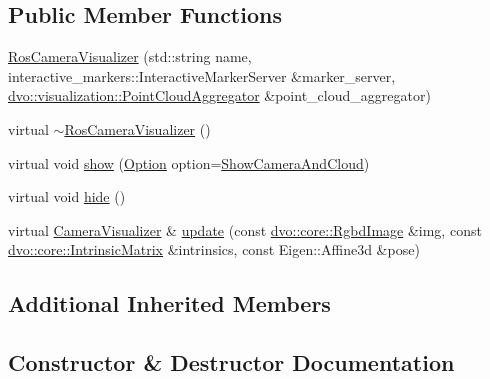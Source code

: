 \subsection*{Public Member Functions}
\begin{DoxyCompactItemize}
\item 
\mbox{\hyperlink{classdvo__ros_1_1visualization_1_1internal_1_1_ros_camera_visualizer_a48e16edb7cb922fd824f4733b775d0b6}{Ros\+Camera\+Visualizer}} (std\+::string name, interactive\+\_\+markers\+::\+Interactive\+Marker\+Server \&marker\+\_\+server, \mbox{\hyperlink{classdvo_1_1visualization_1_1_point_cloud_aggregator}{dvo\+::visualization\+::\+Point\+Cloud\+Aggregator}} \&point\+\_\+cloud\+\_\+aggregator)
\item 
virtual \mbox{\hyperlink{classdvo__ros_1_1visualization_1_1internal_1_1_ros_camera_visualizer_aec973f21c7f3bc77ab4253b86f370dbf}{$\sim$\+Ros\+Camera\+Visualizer}} ()
\item 
virtual void \mbox{\hyperlink{classdvo__ros_1_1visualization_1_1internal_1_1_ros_camera_visualizer_afb9b360caa2de42ad4b9fd55c85b98df}{show}} (\mbox{\hyperlink{classdvo_1_1visualization_1_1_camera_visualizer_a0526f50be9f298c4f7d1f91018d50af7}{Option}} option=\mbox{\hyperlink{classdvo_1_1visualization_1_1_camera_visualizer_a0526f50be9f298c4f7d1f91018d50af7a0ff8fc7d7283f27066e93ca0d4ef3f19}{Show\+Camera\+And\+Cloud}})
\item 
virtual void \mbox{\hyperlink{classdvo__ros_1_1visualization_1_1internal_1_1_ros_camera_visualizer_a4812a8e3c5573a68fb74cabbf2f70422}{hide}} ()
\item 
virtual \mbox{\hyperlink{classdvo_1_1visualization_1_1_camera_visualizer}{Camera\+Visualizer}} \& \mbox{\hyperlink{classdvo__ros_1_1visualization_1_1internal_1_1_ros_camera_visualizer_aa347218752bde73e09874771fe3b4410}{update}} (const \mbox{\hyperlink{structdvo_1_1core_1_1_rgbd_image}{dvo\+::core\+::\+Rgbd\+Image}} \&img, const \mbox{\hyperlink{structdvo_1_1core_1_1_intrinsic_matrix}{dvo\+::core\+::\+Intrinsic\+Matrix}} \&intrinsics, const Eigen\+::\+Affine3d \&pose)
\end{DoxyCompactItemize}
\subsection*{Additional Inherited Members}


\subsection{Constructor \& Destructor Documentation}
\mbox{\label{classdvo__ros_1_1visualization_1_1internal_1_1_ros_camera_visualizer_a48e16edb7cb922fd824f4733b775d0b6}} 
